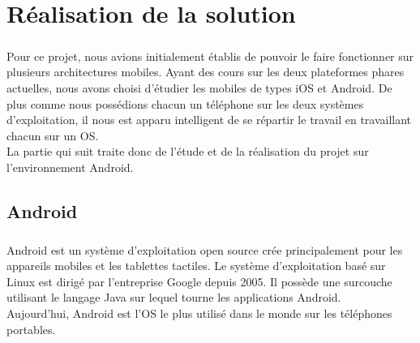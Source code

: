 \cleardoublepage



\chapter{Réalisation de la solution}

\paragraph{}
Pour ce projet, nous avions initialement établis de pouvoir le faire fonctionner sur plusieurs 
architectures mobiles. Ayant des cours sur les deux plateformes phares actuelles, nous avons choisi
d'étudier les mobiles de types iOS et Android. De plus comme nous possédions chacun un téléphone 
sur les deux systèmes d'exploitation, il nous est apparu intelligent de se répartir le travail en 
travaillant chacun sur un OS.
\\
La partie qui suit traite donc de l'étude et de la réalisation du projet sur l'environnement Android.



\section{Android}



\paragraph{}
Android est un système d'exploitation open source crée principalement pour les appareils mobiles et 
les tablettes tactiles. Le système d'exploitation basé sur Linux est dirigé par l'entreprise Google
depuis 2005. Il possède une surcouche utilisant le langage Java sur lequel tourne les applications 
Android.
\\
Aujourd'hui, Android est l'OS le plus utilisé dans le monde sur les téléphones portables.



